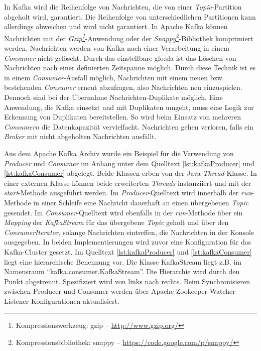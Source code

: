 In Kafka wird die Reihenfolge von Nachrichten, die von einer \textit{Topic}-Partition abgeholt wird, garantiert. Die Reihenfolge von unterschiedlichen Partitionen kann allerdings abweichen und wird nicht garantiert. In Apache Kafka können Nachrichten mit der \textit{Gzip\footnote{Kompressionswerkzeug: gzip -- \url{http://www.gzip.org/}}}-Anwendung oder der \textit{Snappy\footnote{Kompressionsbibliothek: snappy -- \url{https://code.google.com/p/snappy/}}}-Bibliothek komprimiert werden. Nachrichten werden von Kafka nach einer Verarbeitung in einem \textit{Consumer} nicht gelöscht. Durch das einstellbare \gls{glo:sla} ist das Löschen von Nachrichten nach einer definierten Zeitspanne möglich. Durch diese Technik ist es in einem \textit{Consumer}-Ausfall möglich, Nachrichten mit einem neuen bzw. bestehenden \textit{Consumer} erneut abzufragen, also Nachrichten neu einzuspielen. Dennoch sind bei der Übernahme Nachrichten-Duplikate möglich. Eine Anwendung, die Kafka einsetzt und mit Duplikaten umgeht, muss eine Logik zur Erkennung von Duplikaten bereitstellen.
So wird beim Einsatz von mehreren \textit{Consumern} die Datenkapazität vervielfacht. Nachrichten gehen verloren, falls ein \textit{Broker} mit nicht abgeholten Nachrichten ausfällt. 

Aus dem Apache Kafka Archiv  wurde ein Beispiel für die Verwendung von \textit{Producer} und \textit{Consumer} im Anhang unter dem Quelltext \ref{lst:kafkaProducer} und \ref{lst:kafkaConsumer} abgelegt. Beide Klassen erben von der Java \textit{Thread}-Klasse. In einer externen Klasse können beide erweiterten \textit{Threads} instanziiert und mit der \textit{start}-Methode ausgeführt werden. Im \textit{Producer}-Quelltext wird innerhalb der \textit{run}-Methode in einer Schleife eine Nachricht dauerhaft an einen übergebenen \textit{Topic} gesendet. Im \textit{Consumer}-Quelltext wird ebenfalls in der \textit{run}-Methode über ein \textit{Mapping} der \textit{KafkaStream} für das übergebene \textit{Topic} geholt und über den \textit{ConsumerIterator}, solange Nachrichten eintreffen, die Nachrichten in der Konsole ausgegeben. In beiden Implementierungen wird zuvor eine Konfiguration für das Kafka-Cluster gesetzt. Im Quelltext \ref{lst:kafkaProducer} und \ref{lst:kafkaConsumer} liegt eine hierarchische Benennung vor. Die Klasse KafkaStream liegt z.B. im Namensraum "`kafka.consumer.KafkaStream"'. Die Hierarchie wird durch den Punkt abgetrennt. Spezifiziert wird von links nach rechts. Beim Synchronisieren zwischen Producer und Consumer werden über Apache Zookeeper Watcher Listener Konfigurationen aktualisiert.

